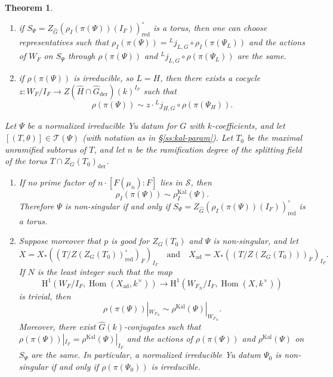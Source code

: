 \documentclass[reqno]{amsart}
\numberwithin{equation}{subsection}
\newcommand{\ol}[1]{\overline{#1}}
\newcommand{\wh}[1]{\widehat{#1}}
\newcommand{\co}{\colon}
\newcommand{\ld}{{}^L}
\newcommand\cS{\mathcal{S}}
\newcommand\cT{\mathcal{T}}
\DeclareMathOperator{\Hom}{Hom}
\DeclareMathOperator{\ad}{ad}
\DeclareMathOperator{\red}{red}
\DeclareMathOperator{\Kal}{Kal}
\DeclareMathOperator{\der}{der}
\newcommand{\rH}{\ensuremath{\mathrm{H}}\xspace}
\newtheorem{thm}{Theorem}[subsection]
\theoremstyle{remark}
\numberwithin{equation}{subsection}
\numberwithin{figure}{subsection}
\begin{document}
\begin{thm}
\begin{enumerate}
    \begin{enumerate}[label=(\alph*)]
        \item if $S_\Psi = Z_{\wh G}(\rho_I(\pi(\Psi))(I_F))^\circ_{\red}$ is a torus, then one can choose representatives such that $\rho_I(\pi(\Psi)) = \ld j_{L,G} \circ \rho_I(\pi(\Psi_L))$ and the actions of $W_F$ on $S_\Psi$ through $\rho(\pi(\Psi))$ and $\ld j_{L,G} \circ \rho(\pi(\Psi_L))$ are the same.
        \item if $\rho(\pi(\Psi))$ is irreducible, so $L = H$, then there exists a cocycle $z\co W_F/I_F \to Z(\wh H \cap \wh G_{\der})(k)^{I_F}$ such that
        \[
        \rho(\pi(\Psi)) \sim z \cdot \ld j_{H,G} \circ \rho(\pi(\Psi_H)).
        \]
    \end{enumerate}
\end{enumerate}
Let $\Psi$ be a normalized irreducible Yu datum for $G$ with $k$-coefficients, and let $[(T, \theta)] \in \cT(\Psi)$ (with notation as in \S\ref{ss:kal-param}). Let $T_0$ be the maximal unramified subtorus of $T$, and let $n$ be the ramification degree of the splitting field of the torus $T \cap Z_G(T_0)_{\der}$.
\begin{enumerate}[label=(\Alph*)]
    \item If no prime factor of $n \cdot [F(\mu_n):F]$ lies in $\cS$, then
    \begin{equation}\label{eqn:abstract-agreement-on-inertia}
    \rho_I(\pi(\Psi)) \sim \rho_I^{\Kal}(\Psi).
    \end{equation}
    Therefore $\Psi$ is non-singular if and only if $S_\Psi = Z_{\wh G}(\rho_I(\pi(\Psi))(I_F))^\circ_{\red}$ is a torus.
    \item Suppose moreover that $p$ is good for $Z_G(T_0)$ and $\Psi$ is non-singular, and let 
    \[
    X = X_*((T/Z(Z_G(T_0))^\circ_{\red})_{\ol F})_{I_F} \quad \text{and} \quad X_{\ad} = X_*((T/Z(Z_G(T_0)))_{\ol F})_{I_F}. 
    \]
    If $N$ is the least integer such that the map
    \[
    \rH^1(W_F/I_F, \Hom(X_{\ad}, k^\times)) \to \rH^1(W_{F_N}/I_F, \Hom(X, k^\times))
    \]
    is trivial, then
    \begin{equation}\label{eqn:abstract-agreement-on-finite-index}
    \rho(\pi(\Psi))|_{W_{F_N}} \sim \rho^{\Kal}(\Psi)|_{W_{F_N}}.
    \end{equation}
    Moreover, there exist $\wh G(k)$-conjugates such that $\rho(\pi(\Psi))|_{I_F} = \rho^{\Kal}(\Psi)|_{I_F}$ and the actions of $\rho(\pi(\Psi))$ and $\rho^{\Kal}(\Psi)$ on $S_\Psi$ are the same. In particular, a normalized irreducible Yu datum $\Psi_0$ is non-singular if and only if $\rho(\pi(\Psi_0))$ is irreducible.
\end{enumerate} 
\end{thm}
\end{document}
